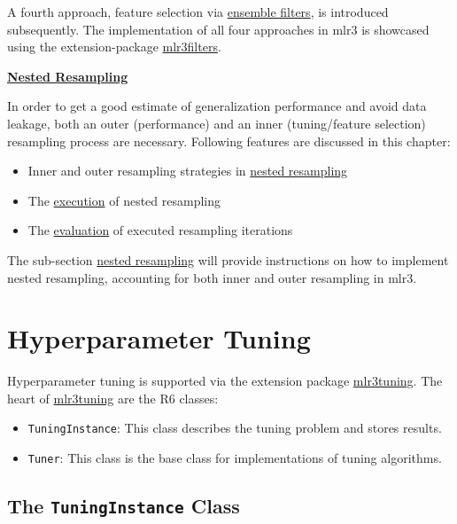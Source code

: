 \documentclass[
  11pt,
  parskip=half,
  DIV=calc,
  BCOR=10mm,
  x11names]{scrbook}
\providecommand{\tightlist}{%
  \setlength{\itemsep}{0pt}\setlength{\parskip}{0pt}}
\begin{document}
A fourth approach, feature selection via \protect\hyperlink{fs-ensemble}{ensemble filters}, is introduced subsequently.
The implementation of all four approaches in mlr3 is showcased using the extension-package \href{https://mlr3filters.mlr-org.com}{mlr3filters}.

\protect\hyperlink{nested-resampling}{\textbf{Nested Resampling}}

In order to get a good estimate of generalization performance and avoid data leakage, both an outer (performance) and an inner (tuning/feature selection) resampling process are necessary.
Following features are discussed in this chapter:

\begin{itemize}
\tightlist
\item
  Inner and outer resampling strategies in \protect\hyperlink{nested-resampling}{nested resampling}
\item
  The \protect\hyperlink{nested-resamp-exec}{execution} of nested resampling
\item
  The \protect\hyperlink{nested-resamp-eval}{evaluation} of executed resampling iterations
\end{itemize}

The sub-section \protect\hyperlink{nested-resampling}{nested resampling} will provide instructions on how to implement nested resampling, accounting for both inner and outer resampling in mlr3.

\hypertarget{tuning}{%
\section{Hyperparameter Tuning}\label{tuning}}

Hyperparameter tuning is supported via the extension package \href{https://mlr3tuning.mlr-org.com}{mlr3tuning}.
The heart of \href{https://mlr3tuning.mlr-org.com}{mlr3tuning} are the R6 classes:

\begin{itemize}
\tightlist
\item
  \texttt{TuningInstance}: This class describes the tuning problem and stores results.
\item
  \texttt{Tuner}: This class is the base class for implementations of tuning algorithms.
\end{itemize}

\hypertarget{tuning-optimization}{%
\subsection{\texorpdfstring{The \texttt{TuningInstance} Class}{The TuningInstance Class}}\label{tuning-optimization}}
\end{document}

